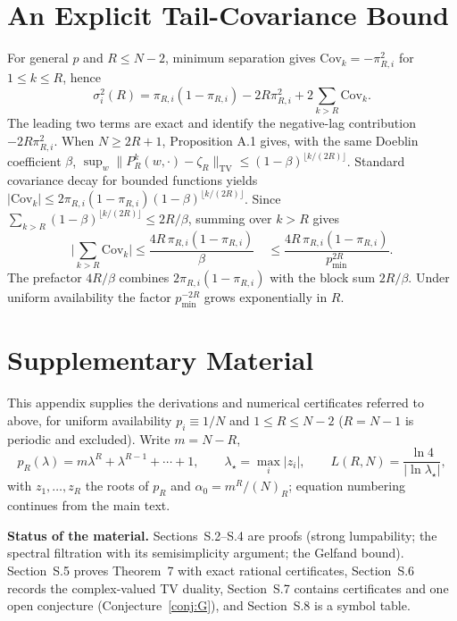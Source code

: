 \documentclass[twoside,11pt]{article}
\begin{document}
\section{An Explicit Tail-Covariance Bound}
For general $p$ and $R\leq N-2$, minimum separation gives $\mathrm{Cov}_k=-\pi_{R,i}^{2}$ for $1\leq k\leq R$, hence
\begin{equation}\label{eq:e49}
\sigma_i^{2}(R)=\pi_{R,i}(1-\pi_{R,i})-2R\pi_{R,i}^{2}+2\sum_{k>R}\mathrm{Cov}_k.
\end{equation}
The leading two terms are exact and identify the negative-lag contribution $-2R\pi_{R,i}^{2}$. When $N\geq2R+1$, Proposition A.1 gives, with the same Doeblin coefficient $\beta$, $\sup_w\|P_R^{k}(w,\cdot)-\zeta_R\|_{\mathrm{TV}}\leq(1-\beta)^{\lfloor k/(2R)\rfloor}$. Standard covariance decay for bounded functions yields $|\mathrm{Cov}_k|\leq2\pi_{R,i}(1-\pi_{R,i})(1-\beta)^{\lfloor k/(2R)\rfloor}$. Since $\sum_{k>R}(1-\beta)^{\lfloor k/(2R)\rfloor}\leq2R/\beta$, summing over $k>R$ gives
\begin{equation}\label{eq:e50}
\Big|\sum_{k>R}\mathrm{Cov}_k\Big| \leq\dfrac{4R\,\pi_{R,i}(1-\pi_{R,i})}{\beta}\quad \leq\dfrac{4R\,\pi_{R,i}(1-\pi_{R,i})}{p_{\min}^{2R}}.
\end{equation}
The prefactor $4R/\beta$ combines $2\pi_{R,i}(1-\pi_{R,i})$ with the
block sum $2R/\beta$. Under uniform availability the factor
$p_{\min}^{-2R}$ grows exponentially in $R$.

\section{Supplementary Material}
\label{app:supp}
\setcounter{subsection}{1}
\renewcommand{\thesubsection}{S.\arabic{subsection}}

This appendix supplies the derivations and numerical
certificates referred to above, for uniform availability $p_i\equiv1/N$ and
$1\le R\le N-2$ ($R=N-1$ is periodic and excluded). Write $m=N-R$,
\begin{equation}\label{eq:SR-p}
p_R(\lambda)=m\lambda^{R}+\lambda^{R-1}+\cdots+1,\qquad
\lambda_\star=\max_i|z_i|,\qquad L(R,N)=\frac{\ln4}{|\ln\lambda_\star|},
\end{equation}
with $z_1,\dots,z_R$ the roots of $p_R$ and $\alpha_0=m^R/(N)_R$; equation
numbering continues from the main text.

\textbf{Status of the material.} Sections~S.2--S.4 are proofs
(strong lumpability; the spectral filtration with its semisimplicity
argument; the Gelfand bound). Section~S.5 proves Theorem~7 with exact
rational certificates, Section~S.6 records the complex-valued TV duality,
Section~S.7 contains certificates and one open conjecture
(Conjecture~\ref{conj:G}), and Section~S.8 is a symbol table.
\end{document}
